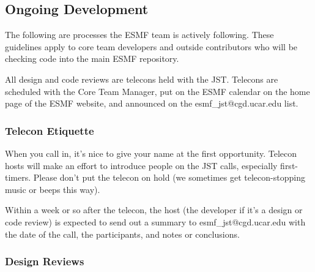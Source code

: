 \subsection{Ongoing Development}

The following are processes the ESMF team is actively following.  These
guidelines apply to core team developers and outside contributors
who will be checking code into the main ESMF repository.

All design and code reviews are telecons held with the JST. 
Telecons are scheduled with the Core Team Manager, put on the ESMF
calendar on the home page of the ESMF website, and announced on the
esmf\_jst@cgd.ucar.edu list.

\subsubsection{Telecon Etiquette}

When you call in, it's nice to give your name at the first opportunity.
Telecon hosts will make an effort to introduce people on the JST calls,
especially first-timers. Please don't put the telecon on hold (we sometimes
get telecon-stopping music or beeps this way).

Within a week or so after the telecon, the host (the developer if it's a design
or code review) is expected to send out a summary to esmf\_jst@cgd.ucar.edu
with the date of the call, the participants, and notes or conclusions.

\subsubsection{Design Reviews}

